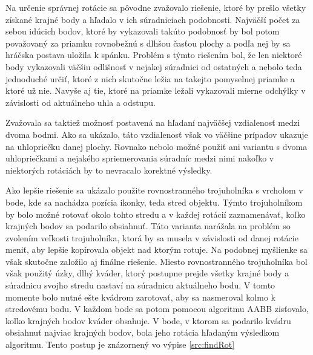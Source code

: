 \documentclass[slovak, bachelorpractice]{diploma}
\begin{document}
Na určenie správnej rotácie sa pôvodne zvažovalo riešenie, ktoré by prešlo všetky získané krajné body a hľadalo v ich súradniciach podobnosti. Najväčší počet za sebou idúcich bodov, ktoré by vykazovali takúto podobnosť by bol potom považovaný za priamku rovnobežnú s dlhšou časťou plochy a podľa nej by sa hráčska postava uložila k spánku. Problém s týmto riešením bol, že len niektoré body vykazovali väčšiu odlišnosť v nejakej súradnici od ostatných a nebolo teda jednoduché určiť, ktoré z nich skutočne ležia na takejto pomyselnej priamke a ktoré už nie. Navyše aj tie, ktoré na priamke ležali vykazovali mierne odchýlky v závislosti od aktuálneho uhla a odstupu.

Zvažovala sa taktiež možnosť postavená na hľadaní najväčšej vzdialenosť medzi dvoma bodmi. Ako sa ukázalo, táto vzdialenosť však vo väčšine prípadov ukazuje na uhlopriečku danej plochy. Rovnako nebolo možné použiť ani variantu s dvoma uhlopriečkami a nejakého spriemerovania súradníc medzi nimi nakoľko v niektorých rotáciách by to nevracalo korektné výsledky. 

Ako lepšie riešenie sa ukázalo použite rovnostranného trojuholníka s vrcholom v bode, kde sa nachádza pozícia ikonky, teda stred objektu. Týmto trojuholníkom by bolo možné rotovať okolo tohto stredu a v každej rotácií zaznamenávať, koľko krajných bodov sa podarilo obsiahnuť. Táto varianta narážala na problém so zvolením veľkosti trojuholníka, ktorá by sa musela v závislosti od danej rotácie meniť, aby lepšie kopírovala objekt nad ktorým rotuje. Na podobnej myšlienke sa však skutočne založilo aj finálne riešenie. Miesto rovnostranného trojuholníka bol však použitý úzky, dlhý kváder, ktorý postupne prejde všetky krajné body a súradnicu svojho stredu nastaví na súradnicu aktuálneho bodu. V tomto momente bolo nutné ešte kvádrom zarotovať, aby sa nasmeroval kolmo k stredovému bodu. V každom bode sa potom pomocou algoritmu AABB zisťovalo, koľko krajných bodov kváder obsahuje. V bode, v ktorom sa podarilo kvádru obsiahnuť najviac krajných bodov, bola jeho rotácia hľadaným výsledkom algoritmu. Tento postup je znázornený vo výpise \ref{src:findRot}
\end{document}
